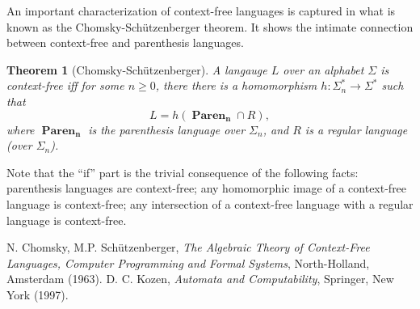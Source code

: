 \documentclass[12pt]{article}
\newtheorem{thm}{Theorem}
\begin{document}
An important characterization of context-free languages is captured in what is known as the Chomsky-Sch\"utzenberger theorem.  It shows the intimate connection between context-free and parenthesis languages.

\begin{thm}[Chomsky-Sch\"utzenberger]  A langauge $L$ over an alphabet $\Sigma$ is context-free iff for some $n\ge 0$, there there is a homomorphism $h:\Sigma_n^* \to \Sigma^*$ such that $$L=h(\boldsymbol{\operatorname{Paren}_n}\cap R),$$ where $\boldsymbol{\operatorname{Paren}_n}$ is the parenthesis language over $\Sigma_n$, and $R$ is a regular language (over $\Sigma_n$).
\end{thm}

Note that the ``if'' part is the trivial consequence of the following facts: parenthesis languages are context-free; any homomorphic image of a context-free language is context-free; any intersection of a context-free language with a regular language is context-free.

\begin{thebibliography}{9}
 N. Chomsky, M.P. Sch\"utzenberger, {\em The Algebraic Theory of Context-Free Languages, Computer Programming and Formal Systems}, North-Holland, Amsterdam (1963).
 D. C. Kozen, {\em Automata and Computability}, Springer, New York (1997).
\end{thebibliography}
\end{document}

